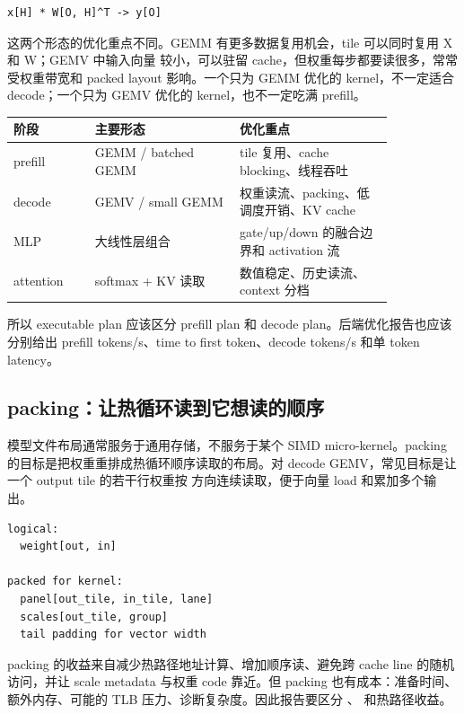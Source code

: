 \begin{lstlisting}[numbers=none,caption={decode linear 的抽象形态}]
x[H] * W[O, H]^T -> y[O]
\end{lstlisting}

这两个形态的优化重点不同。GEMM 有更多数据复用机会，tile 可以同时复用 X 和 W；GEMV 中输入向量  较小，可以驻留 cache，但权重每步都要读很多，常常受权重带宽和 packed layout 影响。一个只为 GEMM 优化的 kernel，不一定适合 decode；一个只为 GEMV 优化的 kernel，也不一定吃满 prefill。

\begin{center}
\begin{tabular}{p{0.18\linewidth}p{0.32\linewidth}p{0.34\linewidth}}
\toprule
阶段 & 主要形态 & 优化重点 \\
\midrule
prefill & GEMM / batched GEMM & tile 复用、cache blocking、线程吞吐 \\
decode & GEMV / small GEMM & 权重读流、packing、低调度开销、KV cache \\
MLP & 大线性层组合 & gate/up/down 的融合边界和 activation 流 \\
attention & softmax + KV 读取 & 数值稳定、历史读流、context 分档 \\
\bottomrule
\end{tabular}
\end{center}

所以 executable plan 应该区分 prefill plan 和 decode plan。后端优化报告也应该分别给出 prefill tokens/s、time to first token、decode tokens/s 和单 token latency。

\subsection{packing：让热循环读到它想读的顺序}

模型文件布局通常服务于通用存储，不服务于某个 SIMD micro-kernel。packing 的目标是把权重重排成热循环顺序读取的布局。对 decode GEMV，常见目标是让一个 output tile 的若干行权重按  方向连续读取，便于向量 load 和累加多个输出。

\begin{lstlisting}[numbers=none,caption={packing 前后的思维差异}]
logical:
  weight[out, in]

packed for kernel:
  panel[out_tile, in_tile, lane]
  scales[out_tile, group]
  tail padding for vector width
\end{lstlisting}

packing 的收益来自减少热路径地址计算、增加顺序读、避免跨 cache line 的随机访问，并让 scale metadata 与权重 code 靠近。但 packing 也有成本：准备时间、额外内存、可能的 TLB 压力、诊断复杂度。因此报告要区分 、 和热路径收益。

